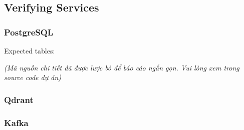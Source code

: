 \hypertarget{verifying-services}{%
\subsection{Verifying Services}}

\hypertarget{postgresql}{%
\subsubsection{PostgreSQL}}

\begin{Shaded}
\begin{Highlighting}[]
 


\end{Highlighting}
\end{Shaded}

Expected tables:

\emph{(Mã nguồn chi tiết đã được lược bỏ để báo cáo ngắn gọn. Vui lòng
xem trong source code dự án)}

\hypertarget{qdrant}{%
\subsubsection{Qdrant}}

\begin{Shaded}
\begin{Highlighting}[]

\end{Highlighting}
\end{Shaded}

\hypertarget{kafka}{%
\subsubsection{Kafka}}

